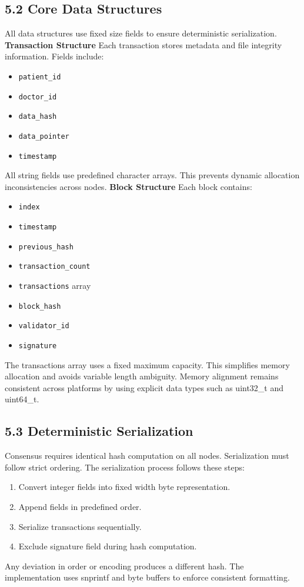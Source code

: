 \subsection*{5.2 Core Data Structures}
All data structures use fixed size fields to ensure deterministic serialization.
\textbf{Transaction Structure}
Each transaction stores metadata and file integrity information.
Fields include:
\begin{itemize}
\item \texttt{patient\_id}
\item \texttt{doctor\_id}
\item \texttt{data\_hash}
\item \texttt{data\_pointer}
\item \texttt{timestamp}
\end{itemize}
All string fields use predefined character arrays. This prevents dynamic allocation inconsistencies across nodes.
\textbf{Block Structure}
Each block contains:
\begin{itemize}
\item \texttt{index}
\item \texttt{timestamp}
\item \texttt{previous\_hash}
\item \texttt{transaction\_count}
\item \texttt{transactions} array
\item \texttt{block\_hash}
\item \texttt{validator\_id}
\item \texttt{signature}
\end{itemize}
The transactions array uses a fixed maximum capacity. This simplifies memory allocation and avoids variable length ambiguity.
Memory alignment remains consistent across platforms by using explicit data types such as uint32_t and uint64_t.

\subsection*{5.3 Deterministic Serialization}
Consensus requires identical hash computation on all nodes. Serialization must follow strict ordering.
The serialization process follows these steps:
\begin{enumerate}
\item Convert integer fields into fixed width byte representation.
\item Append fields in predefined order.
\item Serialize transactions sequentially.
\item Exclude signature field during hash computation.
\end{enumerate}
Any deviation in order or encoding produces a different hash. The implementation uses snprintf and byte buffers to enforce consistent formatting.

